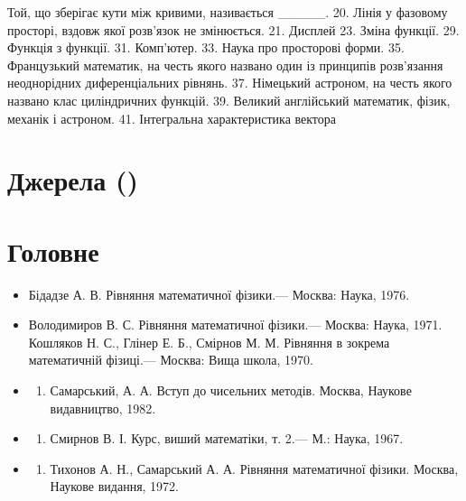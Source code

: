 \documentclass[
]{article}
\providecommand{\tightlist}{%
  \setlength{\itemsep}{0pt}\setlength{\parskip}{0pt}}
\begin{document}
{{{{Той, що зберігає кути між кривими, називається \_\_\_\_\_. 20. Лінія у
фазовому просторі, вздовж якої розв'язок не змінюється. 21. Дисплей 23.
Зміна функції. 29. Функція з функції. 31. Комп'ютер. 33. Наука про
просторові форми. 35. Французький математик, на честь якого названо один
із принципів розв'язання неоднорідних диференціальних рівнянь. 37.
Німецький астроном, на честь якого названо клас циліндричних функцій.
39. Великий англійський математик, фізик, механік і астроном. 41.
Інтегральна характеристика вектора

\section{Джерела ()}\label{ux434ux436ux435ux440ux435ux43bux430}

\section{Головне}\label{ux433ux43eux43bux43eux432ux43dux435}

\begin{itemize}
\tightlist
\item
  Бідадзе А. В. Рівняння математичної фізики.--- Москва: Наука, 1976.
\item
  Володимиров В. С. Рівняння математичної фізики.--- Москва: Наука,
  1971. Кошляков Н. С., Глінер Е. Б., Смірнов М. М. Рівняння в зокрема
  математичній фізиці.--- Москва: Вища школа, 1970.
\item
  \begin{enumerate}
  \def\labelenumi{\arabic{enumi}.}
  \setcounter{enumi}{3}
  \tightlist
  \item
    Самарський, А. А. Вступ до чисельних методів. Москва, Наукове
    видавництво, 1982.
  \end{enumerate}
\item
  \begin{enumerate}
  \def\labelenumi{\arabic{enumi}.}
  \setcounter{enumi}{4}
  \tightlist
  \item
    Смирнов В. І. Курс, виший математіки, т. 2.--- М.: Наука, 1967.
  \end{enumerate}
\item
  \begin{enumerate}
  \def\labelenumi{\arabic{enumi}.}
  \setcounter{enumi}{5}
  \tightlist
  \item
    Тихонов А. Н., Самарський А. А. Рівняння математичної фізики.
    Москва, Наукове видання, 1972.
  \end{enumerate}
\end{itemize}

}}}}
\end{document}
